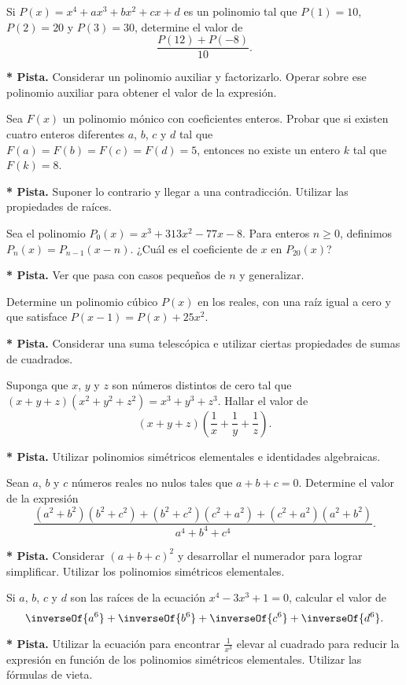 \begin{problem}
    Si $P(x) = x^4 + ax^3 + bx^2 + cx + d$ es un polinomio tal que $P(1) = 10$, $P(2) = 20$ y $P(3) = 30$, determine el valor de
    \[\frac{P(12) + P(-8)}{10}.\]
\end{problem}
\textbf{* Pista.} Considerar un polinomio auxiliar y factorizarlo.
Operar sobre ese polinomio auxiliar para obtener el valor de la expresión.

\begin{problem}
    Sea $F(x)$ un polinomio mónico con coeficientes enteros.
    Probar que si existen cuatro enteros diferentes $a$, $b$, $c$ y $d$ tal que $F(a) = F(b) = F(c)  = F(d) = 5$,
    entonces no existe un entero $k$ tal que $F(k) = 8$.
\end{problem}
\textbf{* Pista.} Suponer lo contrario y llegar a una contradicción.
Utilizar las propiedades de raíces.


\begin{problem}
    Sea el polinomio $P_0(x) = x^3 + 313x^2 - 77x - 8$.
    Para enteros $n \geq 0$, definimos $P_n(x) = P_{n - 1}(x - n)$.
    ¿Cuál es el coeficiente de $x$ en $P_{20}(x)$?
\end{problem}
\textbf{* Pista.} Ver que pasa con casos pequeños de $n$ y generalizar.



\begin{problem}
    Determine un polinomio cúbico $P(x)$ en los reales, con una raíz igual a cero y que satisface $P(x - 1) = P(x) + 25x^2$.
\end{problem}
\textbf{* Pista.} Considerar una suma telescópica e utilizar ciertas propiedades de sumas de cuadrados.


\begin{problem}
    Suponga que $x$, $y$ y $z$ son números distintos de cero tal que $(x + y + z)(x^2 + y^2 + z^2) = x^3 + y^3 + z^3$.
    Hallar el valor de
    \[(x + y + z)\left(\frac{1}{x} + \frac{1}{y} + \frac{1}{z}\right).\]
\end{problem}
\textbf{* Pista.} Utilizar polinomios simétricos elementales e identidades algebraicas.


\begin{problem}
    Sean $a$, $b$ y $c$ números reales no nulos tales que $a + b + c = 0$.
    Determine el valor de la expresión
    \[\frac{(a^2 + b^2)(b^2 + c^2) + (b^2 + c^2)(c^2 + a^2) + (c^2 + a^2)(a^2 + b^2)}{a^4 + b^4 + c^4}.\]
\end{problem}
\textbf{* Pista.} Considerar $(a + b + c)^2$ y desarrollar el numerador para lograr simplificar.
Utilizar los polinomios simétricos elementales.

\begin{problem}
    Si $a$, $b$, $c$ y $d$ son las raíces de la ecuación $x^4 - 3x^3 + 1 = 0$,
    calcular el valor de
    \[
        \inverseOf{a^6} + \inverseOf{b^6} + \inverseOf{c^6} + \inverseOf{d^6}.
    \]
\end{problem}
\textbf{* Pista.} Utilizar la ecuación para encontrar $\frac{1}{x^3}$ elevar al cuadrado para reducir la expresión en función de los polinomios simétricos elementales.
Utilizar las fórmulas de vieta.